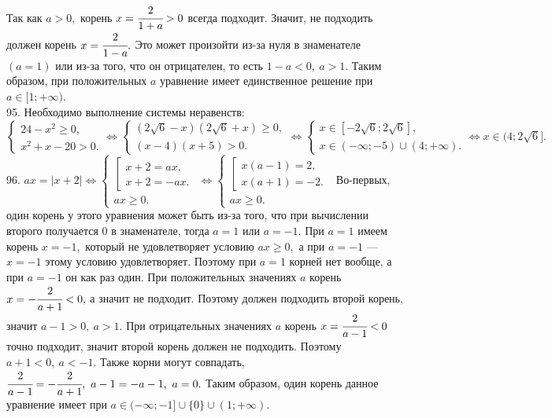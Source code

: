 \documentclass[12pt]{article}
\begin{document}
Так как $a>0,$ корень $x=\cfrac{2}{1+a}>0$ всегда подходит. Значит, не подходить должен корень $x=\cfrac{2}{1-a}.$ Это может произойти из-за нуля в знаменателе $(a=1)$ или из-за того, что он отрицателен, то есть $1-a<0,\ a>1.$ Таким образом, при положительных $a$ уравнение имеет единственное решение при $a\in[1;+\infty).$\\
95. Необходимо выполнение системы неравенств:\\ $\begin{cases} 24-x^2\geqslant0,\\ x^2+x-20>0.\end{cases}\Leftrightarrow
\begin{cases} (2\sqrt{6}-x)(2\sqrt{6}+x)\geqslant0,\\ (x-4)(x+5)>0.\end{cases}\Leftrightarrow
\begin{cases} x\in[-2\sqrt{6};2\sqrt{6}],\\ x\in(-\infty;-5)\cup(4;+\infty).\end{cases}\Leftrightarrow x\in(4;2\sqrt{6}].$\\
96. $ax=|x+2|\Leftrightarrow \begin{cases}\left[\begin{array}{l}x+2=ax,\\ x+2=-ax.\end{array}\right.\\ ax\geqslant0.\end{cases}\Leftrightarrow
\begin{cases}\left[\begin{array}{l}x(a-1)=2,\\ x(a+1)=-2.\end{array}\right.\\ ax\geqslant0.\end{cases}$
Во-первых, один корень у этого уравнения может быть из-за того, что при вычислении второго получается 0 в знаменателе, тогда $a=1$ или $a=-1.$ При $a=1$ имеем корень $x=-1,$ который не удовлетворяет условию $ax\geqslant0,$ а при $a=-1$ --- $x=-1$ этому условию удовлетворяет. Поэтому при $a=1$ корней нет вообще, а при $a=-1$ он как раз один. При положительных значениях $a$ корень $x=-\cfrac{2}{a+1}<0,$ а значит не подходит. Поэтому должен подходить второй корень, значит $a-1>0,\ a>1.$ При отрицательных значениях $a$ корень $x=\cfrac{2}{a-1}<0$ точно подходит, значит второй корень должен не подходить. Поэтому $a+1<0,\ a<-1.$ Также корни могут совпадать, $\cfrac{2}{a-1}=-\cfrac{2}{a+1},\ a-1=-a-1,\ a=0.$ Таким образом, один корень данное уравнение имеет при $a\in(-\infty;-1]\cup\{0\}\cup(1;+\infty).$\\
\end{document}
